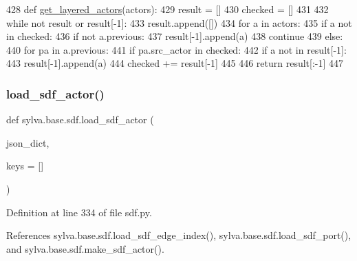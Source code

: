 \begin{DoxyCode}
428     \textcolor{keyword}{def }\hyperlink{namespacesylva_1_1base_1_1sdf_a1e0fb379d9b6a1f2adb650611bdb49e6}{get\_layered\_actors}(actors):
429         result = []
430         checked = []
431 
432         \textcolor{keywordflow}{while} \textcolor{keywordflow}{not} result \textcolor{keywordflow}{or} result[-1]:
433             result.append([])
434             \textcolor{keywordflow}{for} a \textcolor{keywordflow}{in} actors:
435                 \textcolor{keywordflow}{if} a \textcolor{keywordflow}{not} \textcolor{keywordflow}{in} checked:
436                     \textcolor{keywordflow}{if} \textcolor{keywordflow}{not} a.previous:
437                         result[-1].append(a)
438                         \textcolor{keywordflow}{continue}
439                     \textcolor{keywordflow}{else}:
440                         \textcolor{keywordflow}{for} pa \textcolor{keywordflow}{in} a.previous:
441                             \textcolor{keywordflow}{if} pa.src\_actor \textcolor{keywordflow}{in} checked:
442                                 \textcolor{keywordflow}{if} a \textcolor{keywordflow}{not} \textcolor{keywordflow}{in} result[-1]:
443                                     result[-1].append(a)
444             checked += result[-1]
445 
446         \textcolor{keywordflow}{return} result[:-1]
447 
\end{DoxyCode}
\mbox{\label{namespacesylva_1_1base_1_1sdf_a14b2bfbb0fd81d1e114b670f13f718f1}} 
\subsubsection{\texorpdfstring{load\+\_\+sdf\+\_\+actor()}{load\_sdf\_actor()}}
{\footnotesize\ttfamily def sylva.\+base.\+sdf.\+load\+\_\+sdf\+\_\+actor (\begin{DoxyParamCaption}\item[{}]{json\+\_\+dict,  }\item[{}]{keys = {\ttfamily \mbox{[}\mbox{]}} }\end{DoxyParamCaption})}



Definition at line 334 of file sdf.\+py.



References sylva.\+base.\+sdf.\+load\+\_\+sdf\+\_\+edge\+\_\+index(), sylva.\+base.\+sdf.\+load\+\_\+sdf\+\_\+port(), and sylva.\+base.\+sdf.\+make\+\_\+sdf\+\_\+actor().



